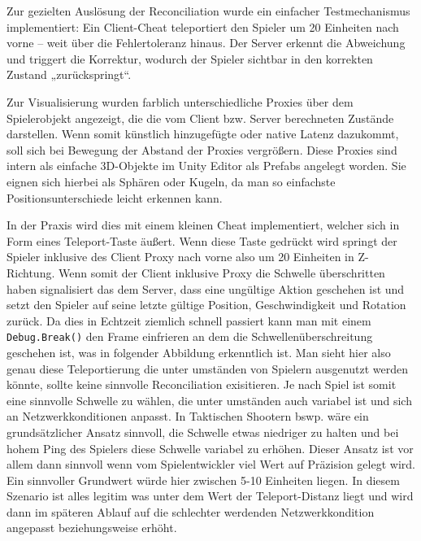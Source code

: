 Zur gezielten Auslösung der Reconciliation wurde ein einfacher Testmechanismus implementiert: Ein Client-Cheat teleportiert den Spieler um 20 Einheiten nach vorne – weit über die Fehlertoleranz hinaus. Der Server erkennt die Abweichung und triggert die Korrektur, wodurch der Spieler sichtbar in den korrekten Zustand „zurückspringt“.

Zur Visualisierung wurden farblich unterschiedliche Proxies über dem Spielerobjekt angezeigt, die die vom Client bzw. Server berechneten Zustände darstellen. Wenn somit künstlich hinzugefügte oder native Latenz dazukommt, soll sich bei Bewegung der Abstand der Proxies vergrößern.
Diese Proxies sind intern als einfache 3D-Objekte im Unity Editor als Prefabs angelegt worden. Sie eignen sich hierbei als Sphären oder Kugeln, da man so einfachste Positionsunterschiede leicht erkennen kann. 

In der Praxis wird dies mit einem kleinen Cheat implementiert, welcher sich in Form eines Teleport-Taste äußert. Wenn diese Taste gedrückt wird springt der Spieler inklusive des Client Proxy nach vorne also um 20 Einheiten in Z-Richtung.
Wenn somit der Client inklusive Proxy die Schwelle überschritten haben signalisiert das dem Server, dass eine ungültige Aktion geschehen ist und setzt den Spieler auf seine letzte gültige Position, Geschwindigkeit und Rotation zurück.
Da dies in Echtzeit ziemlich schnell passiert kann man mit einem \texttt{Debug.Break()} den Frame einfrieren an dem die Schwellenüberschreitung geschehen ist, was in folgender Abbildung erkenntlich ist.
Man sieht hier also genau diese Teleportierung die unter umständen von Spielern ausgenutzt werden könnte, sollte keine sinnvolle Reconciliation exisitieren. Je nach Spiel ist somit eine sinnvolle Schwelle zu wählen, die unter umständen auch variabel ist und sich an Netzwerkkonditionen anpasst.
In Taktischen Shootern bswp. wäre ein grundsätzlicher Ansatz sinnvoll, die Schwelle etwas niedriger zu halten und bei hohem Ping des Spielers diese Schwelle variabel zu erhöhen. Dieser Ansatz ist vor allem dann sinnvoll wenn vom Spielentwickler viel Wert auf Präzision gelegt wird. Ein sinnvoller Grundwert würde hier zwischen 5-10 Einheiten liegen. In diesem Szenario ist alles legitim was unter dem Wert der Teleport-Distanz liegt und wird dann im späteren Ablauf auf die schlechter werdenden Netzwerkkondition angepasst beziehungsweise erhöht.

